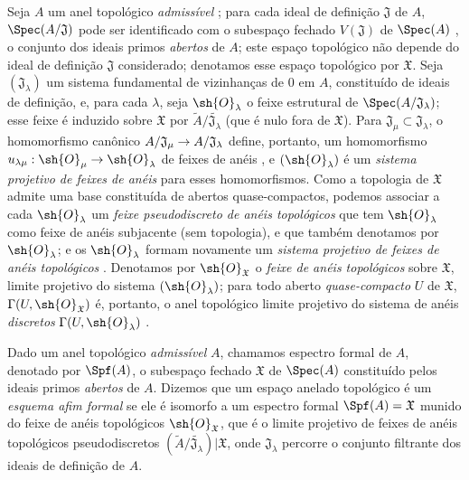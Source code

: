 \documentclass[oneside]{amsart}
\makeatletter
\newcommand{\ega@arrow}[2]{\mathchoice{#1}{#2}{#2}{#2}}
\renewcommand{\to}{\ega@arrow{\longrightarrow}{\rightarrow}}
\newcommand{\oldpage}[2][]{{\marginnote{\normalfont\textbf{#1}~|~#2}}\ignorespaces}
\let\EGAOriginalLabel\label
\renewcommand{\label}[1]{\phantomsection\EGAOriginalLabel{#1}}
\makeatother
\begin{document}
\begin{env}[10.1.1]
\label{I.10.1.1}
Seja $A$ um anel topológico \emph{admissível} ; para cada ideal de definição $\mathfrak{J}$ de $A$, $\Spec(A/\mathfrak{J})$ pode ser identificado com o subespaço fechado $V(\mathfrak{J})$ de $\Spec(A)$ , o conjunto dos ideais primos \emph{abertos} de $A$; este espaço topológico não depende
\oldpage[I]{181}
do ideal de definição $\mathfrak{J}$ considerado; denotamos esse espaço topológico por $\mathfrak{X}$. Seja $(\mathfrak{J}_\lambda)$ um sistema fundamental de vizinhanças de $0$ em $A$, constituído de ideais de definição, e, para cada $\lambda$, seja $\sh{O}_\lambda$ o feixe estrutural de $\Spec(A/\mathfrak{J}_\lambda)$; esse feixe é induzido sobre $\mathfrak{X}$ por $\widetilde{A}/\widetilde{\mathfrak{J}_\lambda}$ (que é nulo fora de $\mathfrak{X}$).
Para $\mathfrak{J}_\mu\subset\mathfrak{J}_\lambda$, o homomorfismo canônico $A/\mathfrak{J}_\mu\to A/\mathfrak{J}_\lambda$ define, portanto, um homomorfismo $u_{\lambda\mu}:\sh{O}_\mu\to\sh{O}_\lambda$ de feixes de anéis , e $(\sh{O}_\lambda)$ é um \emph{sistema projetivo de feixes de anéis} para esses homomorfismos.
Como a topologia de $\mathfrak{X}$ admite uma base constituída de abertos quase-compactos, podemos associar a cada $\sh{O}_\lambda$ um \emph{feixe pseudodiscreto de anéis topológicos}  que tem $\sh{O}_\lambda$ como feixe de anéis subjacente (sem topologia), e que também denotamos por $\sh{O}_\lambda$; e os $\sh{O}_\lambda$ formam novamente um \emph{sistema projetivo de feixes de anéis topológicos} .
Denotamos por $\sh{O}_\mathfrak{X}$ o \emph{feixe de anéis topológicos} sobre $\mathfrak{X}$, limite projetivo do sistema $(\sh{O}_\lambda)$; para todo aberto \emph{quase-compacto} $U$ de $\mathfrak{X}$, $\Gamma(U,\sh{O}_\mathfrak{X})$ é, portanto, o anel topológico limite projetivo do sistema de anéis \emph{discretos} $\Gamma(U,\sh{O}_\lambda)$ .
\end{env}

\begin{definition}[10.1.2]
\label{I.10.1.2}
Dado um anel topológico \emph{admissível} $A$, chamamos espectro formal de $A$, denotado por $\Spf(A)$, o subespaço fechado $\mathfrak{X}$ de $\Spec(A)$ constituído pelos ideais primos \emph{abertos} de $A$.
Dizemos que um espaço anelado topológico é um \emph{esquema afim formal} se ele é isomorfo a um espectro formal $\Spf(A)=\mathfrak{X}$ munido do feixe de anéis topológicos $\sh{O}_\mathfrak{X}$, que é o limite projetivo de feixes de anéis topológicos pseudodiscretos $(\widetilde{A}/\widetilde{\mathfrak{J}_\lambda})|\mathfrak{X}$, onde $\mathfrak{J}_\lambda$ percorre o conjunto filtrante dos ideais de definição de $A$.
\end{definition}
\end{document}
